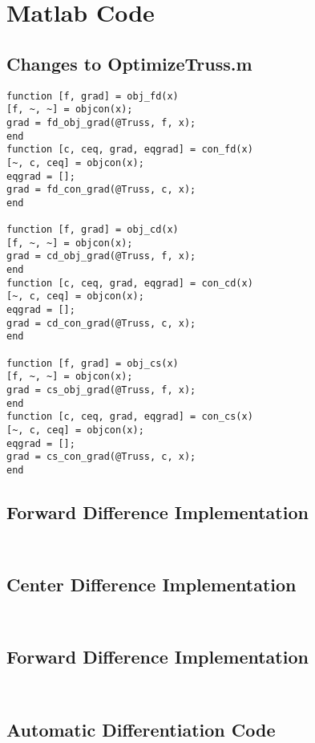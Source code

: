 \documentclass{article}
\begin{document}
\section{Matlab Code}\label{sec:code}
\subsection{Changes to OptimizeTruss.m}\label{sec:optTrussChanges}
\begin{verbatim}
function [f, grad] = obj_fd(x)
[f, ~, ~] = objcon(x);
grad = fd_obj_grad(@Truss, f, x);
end
function [c, ceq, grad, eqgrad] = con_fd(x)
[~, c, ceq] = objcon(x);
eqgrad = [];
grad = fd_con_grad(@Truss, c, x);
end

function [f, grad] = obj_cd(x)
[f, ~, ~] = objcon(x);
grad = cd_obj_grad(@Truss, f, x);
end
function [c, ceq, grad, eqgrad] = con_cd(x)
[~, c, ceq] = objcon(x);
eqgrad = [];
grad = cd_con_grad(@Truss, c, x);
end

function [f, grad] = obj_cs(x)
[f, ~, ~] = objcon(x);
grad = cs_obj_grad(@Truss, f, x);
end
function [c, ceq, grad, eqgrad] = con_cs(x)
[~, c, ceq] = objcon(x);
eqgrad = [];
grad = cs_con_grad(@Truss, c, x);
end
\end{verbatim}

\subsection{Forward Difference Implementation}\label{sec:fd_code}
\inputminted[xleftmargin=10pt,linenos]{matlab}{fd_obj_grad.m}
\inputminted[xleftmargin=10pt,linenos]{matlab}{fd_con_grad.m}

\subsection{Center Difference Implementation}\label{sec:cd_code}
\inputminted[xleftmargin=10pt,linenos]{matlab}{cd_obj_grad.m}
\inputminted[xleftmargin=10pt,linenos]{matlab}{cd_con_grad.m}

\subsection{Forward Difference Implementation}\label{sec:cs_code}
\inputminted[xleftmargin=10pt,linenos]{matlab}{cs_obj_grad.m}
\inputminted[xleftmargin=10pt,linenos]{matlab}{cs_con_grad.m}
\subsection{Automatic Differentiation Code}\label{ADcode}
\inputminted[xleftmargin=10pt,linenos]{matlab}{SpringAutoDiff.m}


\end{document}
